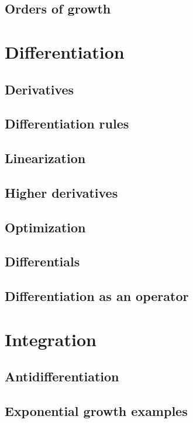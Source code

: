 \documentclass{book}
\begin{document}
\begin{sloppypar}
\section{Orders of growth} \label{ChFunctionsSecOrdersOfGrowth}

\chapter{Differentiation} \label{ChDifferentiation}
\section{Derivatives} \label{ChDifferentiationSecDerivatives}
\section{Differentiation rules} \label{ChDifferentiationSecDifferentiationRules}
\section{Linearization} \label{ChDifferentiationSecLinearization}
\section{Higher derivatives} \label{ChDifferentiationSecHigherDerivatives}
\section{Optimization} \label{ChDifferentiationSecOptimization}
\section{Differentials} \label{ChDifferentiationSecDifferentials}
\section{Differentiation as an operator} \label{ChDifferentiationSecDifferentiationAsAnOperator}

\chapter{Integration} \label{ChIntegration}
\section{Antidifferentiation} \label{ChIntegrationSecAntidifferentiation}
\section{Exponential growth examples} \label{ChIntegrationSecExponentialGrowthExamples}

\end{sloppypar}
\end{document}
